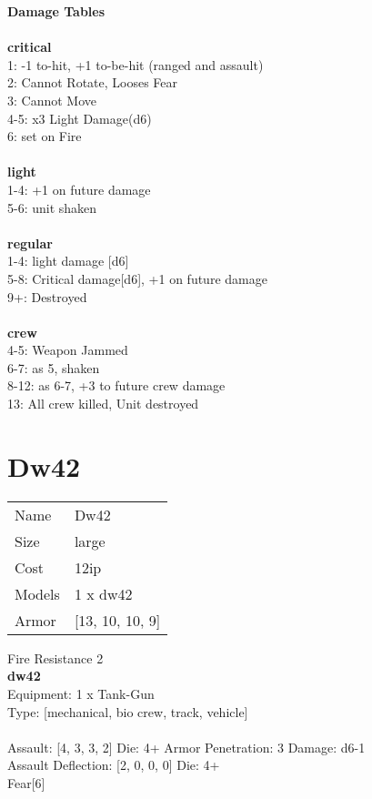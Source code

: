 {\bf Damage Tables} \\
\ \\ {\bf critical } \\
1: -1 to-hit, +1 to-be-hit (ranged and assault) \\
2: Cannot Rotate, Looses Fear \\
3: Cannot Move \\
4-5: x3 Light Damage(d6) \\
6: set on Fire \\
\ \\ {\bf light } \\
1-4: +1 on future damage \\
5-6: unit shaken \\
\ \\ {\bf regular } \\
1-4: light damage [d6] \\
5-8: Critical damage[d6], +1 on future damage \\
9+: Destroyed \\
\ \\ {\bf crew } \\
4-5: Weapon Jammed \\
6-7: as 5, shaken \\
8-12: as 6-7, +3 to future crew damage \\
13: All crew killed, Unit destroyed \\










\pagebreak\pagebreak

\section{ Dw42 }

\begin{tabular}{ll}
  Name & Dw42 \\
  Size & large\\
  Cost & 12ip\\
  Models & 1 x dw42\\
  Armor & [13, 10, 10, 9]\\
\end{tabular}

\noindent Fire Resistance 2\\ 


{\bf dw42 } \\
Equipment: 1 x Tank-Gun \\
Type: [mechanical, bio crew, track, vehicle] \\
\ \\
Assault: [4, 3, 3, 2] Die: 4+ Armor Penetration: 3 Damage: d6-1 \\
Assault Deflection: [2, 0, 0, 0] Die: 4+\\
\indent Fear[6]\\ 
 
